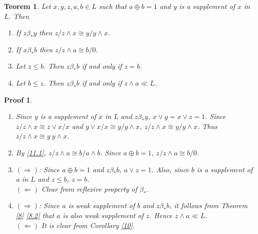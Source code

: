 \documentclass[a4paper,12pt]{article}
\numberwithin{equation}{section}
\theoremstyle{italik}
\newtheorem{teorem}{Teorem}[section]
\newtheorem*{ispat}{Proof}
\begin{document}
\begin{teorem}\label{11}
  Let $ x,y,z,a,b \in L $ such that $ a \oplus b = 1 $ and $ y $ is a supplement of $ x $ in $ L $. Then
  \begin{enumerate}[label=(\roman{*}), ref=(\roman{*})]
    \item
      If $ z \beta_* y $ then $ z / z \wedge x \cong y / y \wedge x $. \label{11.1}
    \item
      If $ x \beta_* b $ then $ z / z \wedge a \cong b / 0 $. \label{11.2}
    \item
      Let $ z \leq b $. Then $ z \beta_* b $ if and only if $ z = b $.\label{11.3}
    \item
      Let $ b \leq z $. Then $ z \beta_* b $ if and only if $ z \wedge a \ll L $.\label{11.4}
  \end{enumerate}
\end{teorem}
\begin{ispat}
  \begin{enumerate}
      \item
        Since $ y $ is a supplement of $ x $ in $ L $ and $ z \beta_* y $, 
        $ x \vee y = x \vee z = 1 $. Since $ z / z  \wedge x \cong z \vee x / x $ and 
        $ y \vee x / x \cong y / y \wedge x $, $ z / z \wedge x \cong y / y \wedge x $. 
        Thus $ z / z \wedge x \cong y \ y \wedge x $.
      \item
        By \ref{11.1}, $ z / z \wedge a \cong b / a \wedge b $. Since $ a \oplus b = 1 $, 
        $ z / z \wedge a \cong b / 0 $.
      \item
        $ ( \Rightarrow ) $: 
        Since $ a \oplus b = 1 $ and $ z \beta_* b $, $ a \vee z = 1 $. Also, since $ b $ is a supplement of 
        a in $ L $ and $ z \leq b $, $ z = b $. \\
        $ ( \Leftarrow ) $ 
        Clear from reflexive property of $ \beta_* $.
      \item
        $ ( \Rightarrow ) $:
        Since $ a $ is weak supplement of $ b $ and $ z \beta_* b $, it follows from 
        Theorem \ref{8} \ref{8.2} that $ a $ is also weak supplement of $ z $. Hence $ z \wedge a \ll L $. \\
        $ ( \Leftarrow ) $ 
        It is clear from Corollary \ref{10}.
    \end{enumerate}
\end{ispat}

\end{document}

